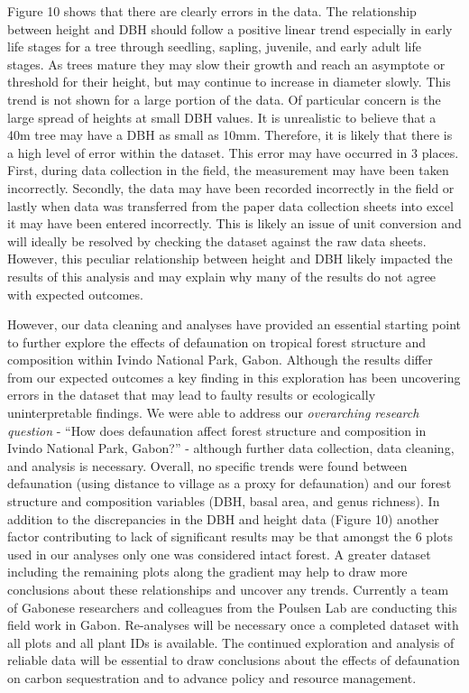 \documentclass[
  12pt,
]{article}
\begin{document}
Figure 10 shows that there are clearly errors in the data. The
relationship between height and DBH should follow a positive linear
trend especially in early life stages for a tree through seedling,
sapling, juvenile, and early adult life stages. As trees mature they may
slow their growth and reach an asymptote or threshold for their height,
but may continue to increase in diameter slowly. This trend is not shown
for a large portion of the data. Of particular concern is the large
spread of heights at small DBH values. It is unrealistic to believe that
a 40m tree may have a DBH as small as 10mm. Therefore, it is likely that
there is a high level of error within the dataset. This error may have
occurred in 3 places. First, during data collection in the field, the
measurement may have been taken incorrectly. Secondly, the data may have
been recorded incorrectly in the field or lastly when data was
transferred from the paper data collection sheets into excel it may have
been entered incorrectly. This is likely an issue of unit conversion and
will ideally be resolved by checking the dataset against the raw data
sheets. However, this peculiar relationship between height and DBH
likely impacted the results of this analysis and may explain why many of
the results do not agree with expected outcomes.

However, our data cleaning and analyses have provided an essential
starting point to further explore the effects of defaunation on tropical
forest structure and composition within Ivindo National Park, Gabon.
Although the results differ from our expected outcomes a key finding in
this exploration has been uncovering errors in the dataset that may lead
to faulty results or ecologically uninterpretable findings. We were able
to address our \emph{overarching research question} - ``How does
defaunation affect forest structure and composition in Ivindo National
Park, Gabon?'' - although further data collection, data cleaning, and
analysis is necessary. Overall, no specific trends were found between
defaunation (using distance to village as a proxy for defaunation) and
our forest structure and composition variables (DBH, basal area, and
genus richness). In addition to the discrepancies in the DBH and height
data (Figure 10) another factor contributing to lack of significant
results may be that amongst the 6 plots used in our analyses only one
was considered intact forest. A greater dataset including the remaining
plots along the gradient may help to draw more conclusions about these
relationships and uncover any trends. Currently a team of Gabonese
researchers and colleagues from the Poulsen Lab are conducting this
field work in Gabon. Re-analyses will be necessary once a completed
dataset with all plots and all plant IDs is available. The continued
exploration and analysis of reliable data will be essential to draw
conclusions about the effects of defaunation on carbon sequestration and
to advance policy and resource management.
\end{document}
